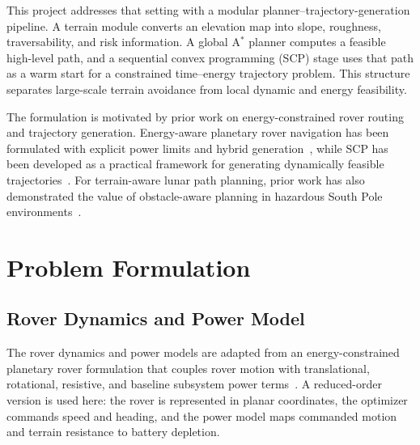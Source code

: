 \documentclass[conf]{new-aiaa}
\begin{document}
This project addresses that setting with a modular planner--trajectory-generation pipeline. A terrain module converts an elevation map into slope, roughness, traversability, and risk information. A global A$^\ast$ planner computes a feasible high-level path, and a sequential convex programming (SCP) stage uses that path as a warm start for a constrained time--energy trajectory problem. This structure separates large-scale terrain avoidance from local dynamic and energy feasibility.

The formulation is motivated by prior work on energy-constrained rover routing and trajectory generation. Energy-aware planetary rover navigation has been formulated with explicit power limits and hybrid generation~\cite{hu2025rover}, while SCP has been developed as a practical framework for generating dynamically feasible trajectories~\cite{malyuta2022scvx}. For terrain-aware lunar path planning, prior work has also demonstrated the value of obstacle-aware planning in hazardous South Pole environments~\cite{feng2025southpole}.

\section{Problem Formulation}

\subsection{Rover Dynamics and Power Model}
The rover dynamics and power models are adapted from an energy-constrained planetary rover formulation that couples rover motion with translational, rotational, resistive, and baseline subsystem power terms~\cite{hu2025rover}. A reduced-order version is used here: the rover is represented in planar coordinates, the optimizer commands speed and heading, and the power model maps commanded motion and terrain resistance to battery depletion.
\end{document}
